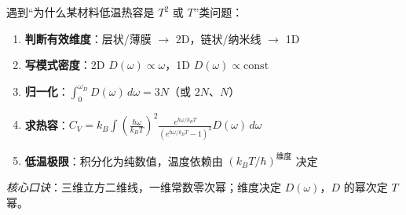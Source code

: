 \begin{thinkbox}
遇到``为什么某材料低温热容是 $T^2$ 或 $T$''类问题：
\begin{enumerate}
    \item \textbf{判断有效维度}：层状/薄膜 $\to$ 2D，链状/纳米线 $\to$ 1D
    \item \textbf{写模式密度}：2D $D(\omega)\propto\omega$，1D $D(\omega)\propto\text{const}$
    \item \textbf{归一化}：$\int_0^{\omega_D}D(\omega)\,d\omega=3N$（或 $2N$、$N$）
    \item \textbf{求热容}：$C_V=k_B\int\left(\frac{\hbar\omega}{k_BT}\right)^2\frac{e^{\hbar\omega/k_BT}}{(e^{\hbar\omega/k_BT}-1)^2}D(\omega)\,d\omega$
    \item \textbf{低温极限}：积分化为纯数值，温度依赖由 $(k_BT/\hbar)^{\text{维度}}$ 决定
\end{enumerate}
\textit{核心口诀}：三维立方二维线，一维常数零次幂；维度决定 $D(\omega)$，$D$ 的幂次定 $T$ 幂。
\end{thinkbox}
